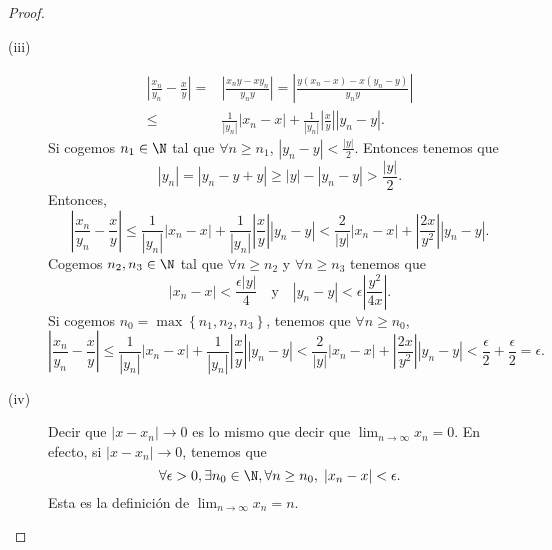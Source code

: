 \begin{proof}
\begin{description}
\item[(iii)] 
\[
\begin{split}
	\left|\frac{x_{n}}{y_{n}} - \frac{x}{y}\right|  = & \left| \frac{x_{n}y-xy_{n}}{y_{n}y}\right| = \left|\frac{y \left(x_{n}-x\right) - x \left(y_{n}-y\right)}{y_{n}y}\right|\\
	\leq & \frac{1}{ \left|y_{n}\right|}  \left|x_{n}-x\right| + \frac{1}{ \left|y_{n}\right|} \left|\frac{x}{y}\right| \left|y_{n}-y\right|.
\end{split}
\]
Si cogemos $\displaystyle n_{1} \in \N $ tal que $\displaystyle \forall n\geq n_{1} $, $\displaystyle \left|y_{n}-y\right| < \frac{ \left|y\right|}{2} $. Entonces tenemos que
\[ \left|y_{n}\right| = \left|y_{n}-y+y\right| \geq \left|y\right| - \left|y_{n}-y\right|> \frac{ \left|y\right|}{2} .\]
Entonces, 
\[ \left|\frac{x_{n}}{y_{n}} - \frac{x}{y}\right| \leq \frac{1}{ \left|y_{n}\right|}  \left|x_{n}-x\right| + \frac{1}{ \left|y_{n}\right|} \left|\frac{x}{y}\right| \left|y_{n}-y\right| < \frac{2}{ \left|y\right|} \left|x_{n}-x\right| + \left|\frac{2x}{y^{2}}\right| \left|y_{n}-y\right|.\]
Cogemos $\displaystyle n_{2}, n_{3}\in\N $ tal que $\displaystyle \forall n\geq n_{2} $ y $\displaystyle \forall n\geq n_{3} $ tenemos que 
\[ \left|x_{n}-x\right| < \frac{\epsilon \left|y\right|}{4} \quad \text{y} \quad \left|y_{n}-y\right| < \epsilon \left|\frac{y^{2}}{4x}\right| .\]
Si cogemos $\displaystyle n_{0} = \max \left\{ n_{1}, n_{2}, n_{3}\right\}  $, tenemos que $\displaystyle \forall n\geq n_{0} $, 
\[\left|\frac{x_{n}}{y_{n}} - \frac{x}{y}\right| \leq \frac{1}{ \left|y_{n}\right|}  \left|x_{n}-x\right| + \frac{1}{ \left|y_{n}\right|} \left|\frac{x}{y}\right| \left|y_{n}-y\right| < \frac{2}{ \left|y\right|} \left|x_{n}-x\right| + \left|\frac{2x}{y^{2}}\right| \left|y_{n}-y\right|<\frac{\epsilon }{2} + \frac{\epsilon }{2} = \epsilon .\]

\item[(iv)] Decir que $\displaystyle \left|x -x_{n}\right|\to 0 $ es lo mismo que decir que $\displaystyle \lim_{n \to \infty}x_{n} = 0 $. En efecto, si $\displaystyle \left|x -x_{n}\right|\to 0 $, tenemos que
\[\forall \epsilon > 0, \exists n_{0}\in\N, \forall n \geq n_{0}, \; \left|x_{n}-x\right|<\epsilon  .\]
Esta es la definición de $\displaystyle \lim_{n \to \infty}x_{n}=n $.

\end{description}
\end{proof}

